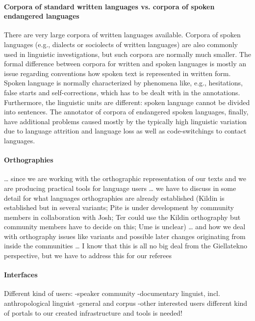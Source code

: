 \documentclass[a4paper,12pt]{article}
\begin{document}
\paragraph{Corpora of standard written languages vs. corpora of spoken endangered languages} 
There are very large corpora of written languages available. Corpora of spoken languages (e.g., dialects or sociolects of written languages) are also commonly used in linguistic investigations, but such corpora are normally much smaller. The formal difference between corpora for written and spoken languages is mostly an issue regarding conventions how spoken text is represented in written form. Spoken language is normally characterized by phenomena like, e.g., hesitations, false starts and self-corrections, which has to be dealt with in the annotations. Furthermore, the linguistic units are different: spoken language cannot be divided into sentences. The annotator of corpora of endangered spoken languages, finally, have additional problems caused mostly by the typically high linguistic variation due to language attrition and language loss as well as code-switchings to contact languages.

\paragraph{Orthographies}
… since we are working with the orthographic representation of our texts and we are producing practical tools for language users … we have to discuss in some detail for what languages orthographies are already established (Kildin is established but in several variants; Pite is under development by community members in collaboration with Josh; Ter could use the Kildin orthography but community members have to decide on this; Ume is unclear) … and how we deal with orthography issues like variants and possible later changes originating from inside the communities … I know that this is all no big deal from the Giellatekno perspective, but we have to address this for our referees 

\paragraph{Interfaces}
Different kind of users:
-speaker community
-documentary linguist, incl. anthropological linguist
-general and corpus
-other interested users
different kind of portals to our created infrastructure and tools is needed!

\end{document}
